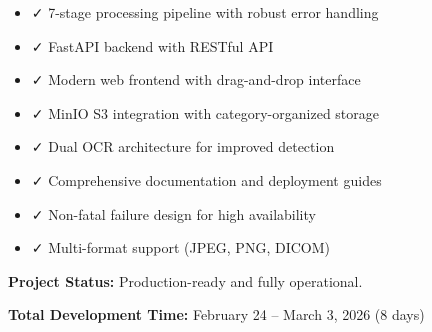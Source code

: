 \documentclass[12pt,a4paper]{article}
\begin{document}
\begin{itemize}[leftmargin=1.2cm]
    \item ✓ 7-stage processing pipeline with robust error handling
    \item ✓ FastAPI backend with RESTful API
    \item ✓ Modern web frontend with drag-and-drop interface
    \item ✓ MinIO S3 integration with category-organized storage
    \item ✓ Dual OCR architecture for improved detection
    \item ✓ Comprehensive documentation and deployment guides
    \item ✓ Non-fatal failure design for high availability
    \item ✓ Multi-format support (JPEG, PNG, DICOM)
\end{itemize}

\bigskip
\textbf{Project Status:} Production-ready and fully operational.

\bigskip
\textbf{Total Development Time:} February 24 – March 3, 2026 (8 days)
\end{document}
